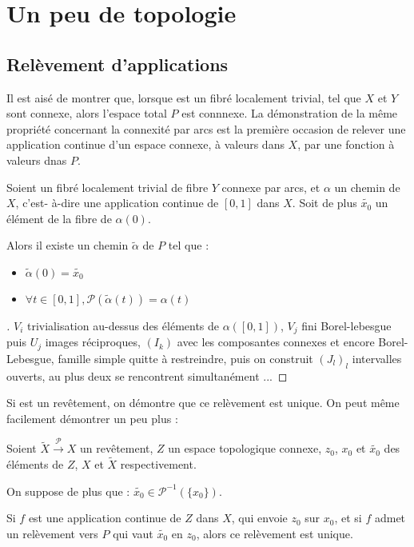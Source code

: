 
\section{Un peu de topologie}

\subsection{Rel\`evement d'applications}

Il est ais\'e de montrer que, lorsque \Fiy est un fibr\'e localement trivial, tel que $X$ et $Y$ sont connexe, alors l'espace total $P$ est connnexe. %
La d\'emonstration de la m\^eme propri\'et\'e concernant la connexit\'e par arcs est la premi\`ere occasion de relever une application continue d'un espace connexe, \`a valeurs dans $X$, %
par une fonction \`a valeurs dnas $P$.

\begin{prop}\label{rchefiy}
Soient \Fiy un fibr\'e localement trivial de fibre $Y$ connexe par arcs, et $\alpha$ un chemin de $X$, %
c'est- \`a-dire une application continue de $[0,1]$ dans $X$. %
Soit de plus $\tilde{x_0}$ un \'el\'ement de la fibre de $\alpha (0)$.

Alors il existe un chemin $\tilde{\alpha}$ de $P$ tel que :
\begin{itemize}
\item $\tilde{\alpha}(0)=\tilde{x_0}$
\item $\forall t \in [0,1] , \mathcal{P}(\tilde{\alpha}(t))=\alpha (t)$
\end{itemize}
\end{prop}

\begin{proof}[\es]
$V_i$ trivialisation au-dessus des \'el\'ements de $\alpha ([0,1])$, %
$V_j$ fini Borel-lebesgue puis $U_j$ images r\'eciproques, %
$(I_k)$ avec les composantes connexes et encore Borel-Lebesgue, famille simple quitte \`a restreindre,
puis on construit $(J_l)_l$ intervalles ouverts, au plus deux se rencontrent simultan\'ement ...
\end{proof}

Si \Fiy est un rev\^etement, on d\'emontre que ce rel\`evement est unique. On peut m\^eme facilement d\'emontrer un peu plus :

\begin{prop}\label{urc}
Soient $\tilde{X} \overset{\mathcal{P}}{\longrightarrow} X$ un rev\^etement, $Z$ un espace topologique connexe, %
$z_0$, $x_0$ et $\tilde{x_0}$ des \'el\'ements de $Z$, $X$ et $\tilde{X}$ respectivement.

\par
On suppose de plus que : $\tilde{x_0}\in\mathcal{P}^{-1}(\{x_0\})$.

\par
Si $f$ est une application continue de $Z$ dans $X$, qui envoie $z_0$ sur $x_0$, et si $f$ admet un rel\`evement vers $P$ qui vaut $\tilde{x_0}$ en $z_0$, %
alors ce rel\`evement est unique.
\end{prop}

